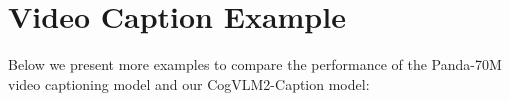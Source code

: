 \section{Video Caption Example}
\label{ap:video_caption_example}


Below we present more examples to compare the performance of the Panda-70M video captioning model and our CogVLM2-Caption model:



% 


% 


